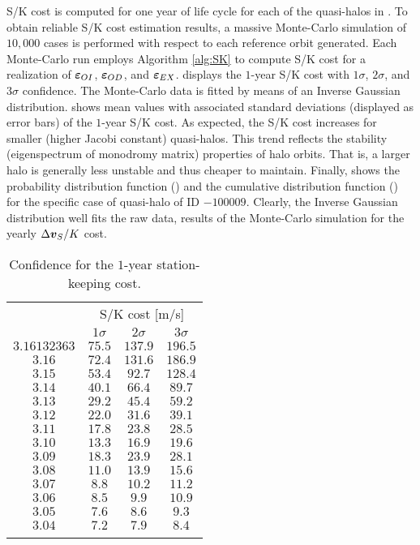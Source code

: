 S/K cost is computed for one year of life cycle for each of the quasi-halos in . To obtain reliable S/K cost estimation results, a massive Monte-Carlo simulation of $10,000$ cases is performed with respect to each reference orbit generated. Each Monte-Carlo run employs Algorithm \ref{alg:SK} to compute S/K cost for a realization of $\boldsymbol{\varepsilon}_{OI}$, $\boldsymbol{\varepsilon}_{OD}$, and $\boldsymbol{\varepsilon}_{EX}$.  displays the $1$-year S/K cost with $1\sigma$, $2\sigma$, and $3\sigma$ confidence. The Monte-Carlo data is fitted by means of an Inverse Gaussian distribution.  shows mean values with associated standard deviations (displayed as error bars) of the $1$-year S/K cost. As expected, the S/K cost increases for smaller (\ie higher Jacobi constant) quasi-halos. This trend reflects the stability (eigenspectrum of monodromy matrix) properties of halo orbits. That is, a larger halo is generally less unstable and thus cheaper to maintain. Finally,  shows the probability distribution function () and the cumulative distribution function () for the specific case of quasi-halo of ID $-100009$. Clearly, the Inverse Gaussian distribution well fits the raw data, results of the Monte-Carlo simulation for the yearly $\Delta\boldsymbol{v}_S/K$ cost.
%
\begin{table}[]
	\caption{Confidence for the $1$-year station-keeping cost.}
	\label{tab:SKconfidence}
	\centering
	\begin{tabular}{cccc}
		\TOPlines
		\multirow{2}{*}{$C_j$ [adim]} & \multicolumn{3}{c}{S/K cost [m/s]} \\
		& $1\sigma$ & $2\sigma$ & $3\sigma$ \\
		\MIDline
		$3.16132363$ & $75.5$ & $137.9$ & $196.5$ \\
		$3.16$ & $72.4$ & $131.6$ & $186.9$ \\
		$3.15$ & $53.4$ & $92.7$ & $128.4$ \\
		$3.14$ & $40.1$ & $66.4$ & $89.7$ \\
		$3.13$ & $29.2$ & $45.4$ & $59.2$ \\
		$3.12$ & $22.0$ & $31.6$ & $39.1$ \\
		$3.11$ & $17.8$ & $23.8$ & $28.5$ \\
		$3.10$ & $13.3$ & $16.9$ & $19.6$ \\
		$3.09$ & $18.3$ & $23.9$ & $28.1$ \\
		$3.08$ & $11.0$ & $13.9$ & $15.6$ \\
		$3.07$ & $8.8$ & $10.2$ & $11.2$ \\
		$3.06$ & $8.5$ & $9.9$ & $10.9$ \\
		$3.05$ & $7.6$ & $8.6$ & $9.3$ \\
		$3.04$ & $7.2$ & $7.9$ & $8.4$ \\
		\BOTTOMlines
	\end{tabular}
\end{table}
